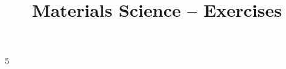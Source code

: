 \documentclass[a4paper]{article}
\title{Materials Science – Exercises}
\begin{document}
    \maketitle
    \clearpage
%    
%    
%    
%    
%    
%    
%    
5    
%    
%    
    
    
\end{document}
